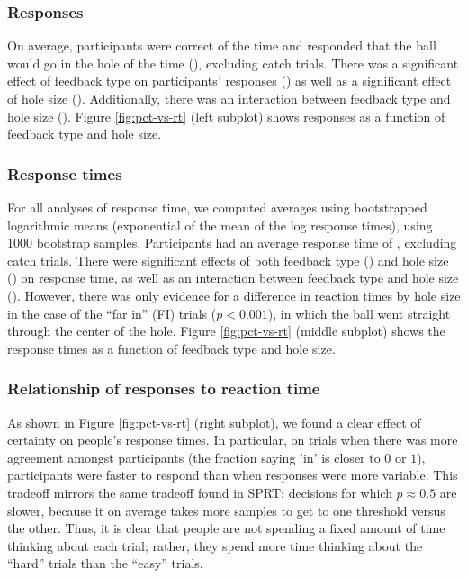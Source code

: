 \documentclass[10pt,letterpaper]{article}
\begin{document}
\subsubsection{Responses}

On average, participants were correct \AvgCorrect{} of the time and responded that the ball would go in the hole \AvgResponse{} of the time (\ResponseN{}), excluding catch trials. There was a significant effect of feedback type on participants' responses (\ResponseHoleClass{}) as well as a significant effect of hole size (\ResponseHoleSize{}). Additionally, there was an interaction between feedback type and hole size (\ResponseFull{}). Figure \ref{fig:pct-vs-rt} (left subplot) shows responses as a function of feedback type and hole size.

\subsubsection{Response times}

For all analyses of response time, we computed averages using bootstrapped logarithmic means (exponential of the mean of the log response times), using 1000 bootstrap samples. Participants had an average response time of \AvgRT{}, excluding catch trials. There were significant effects of both feedback type (\RTHoleClass{}) and hole size (\RTHoleSize{}) on response time, as well as an interaction between feedback type and hole size (\RTFull{}). However, there was only evidence for a difference in reaction times by hole size in the case of the ``far in'' (FI) trials ($p<0.001$), in which the ball went straight through the center of the hole. Figure \ref{fig:pct-vs-rt} (middle subplot) shows the response times as a function of feedback type and hole size.

\subsubsection{Relationship of responses to reaction time}

As shown in Figure \ref{fig:pct-vs-rt} (right subplot), we found a clear effect of certainty on people's response times. In particular, on trials when there was more agreement amongst participants (the fraction saying 'in' is closer to $0$ or $1$), participants were faster to respond than when responses were more variable. This tradeoff mirrors the same tradeoff found in SPRT: decisions for which $p\approx0.5$ are slower, because it on average takes more samples to get to one threshold versus the other. Thus, it is clear that people are not spending a fixed amount of time thinking about each trial; rather, they spend more time thinking about the ``hard'' trials than the ``easy'' trials.
\end{document}
